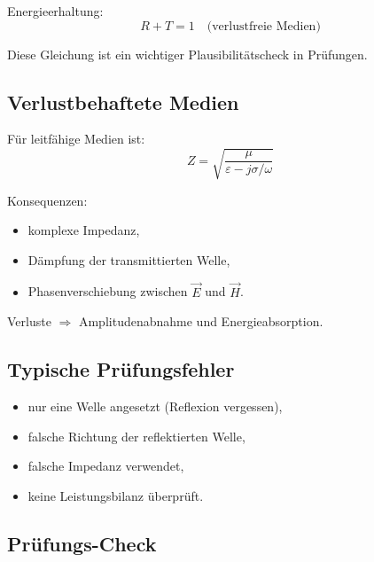 \documentclass[a4paper]{article}
\newcommand{\E}{\vec E}
\newcommand{\Hf}{\vec H}
\newcommand{\eps}{\varepsilon}
\begin{document}
Energieerhaltung:
\[
R + T = 1
\quad \text{(verlustfreie Medien)}
\]

\begin{merke}
Diese Gleichung ist ein wichtiger Plausibilitätscheck in Prüfungen.
\end{merke}

\subsection{Verlustbehaftete Medien}

Für leitfähige Medien ist:
\[
Z = \sqrt{\frac{\mu}{\eps - j\sigma/\omega}}
\]

Konsequenzen:
\begin{itemize}
  \item komplexe Impedanz,
  \item Dämpfung der transmittierten Welle,
  \item Phasenverschiebung zwischen $\E$ und $\Hf$.
\end{itemize}

\begin{schema}
Verluste $\Rightarrow$ Amplitudenabnahme und Energieabsorption.
\end{schema}

\subsection{Typische Prüfungsfehler}

\begin{abwandlung}
\begin{itemize}
  \item nur eine Welle angesetzt (Reflexion vergessen),
  \item falsche Richtung der reflektierten Welle,
  \item falsche Impedanz verwendet,
  \item keine Leistungsbilanz überprüft.
\end{itemize}
\end{abwandlung}

\subsection{Prüfungs-Check}
\end{document}
